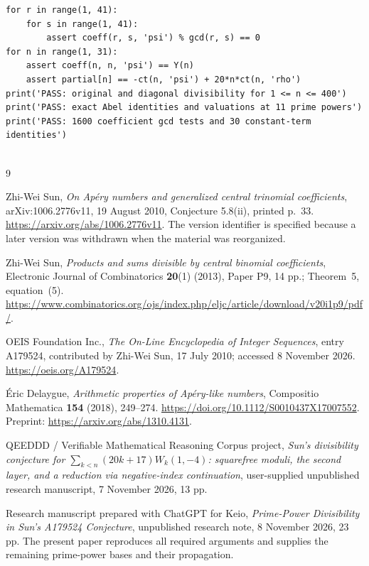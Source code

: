 \documentclass[11pt,a4paper]{article}
\theoremstyle{remark}\newtheorem{remark}[theorem]{Remark}
\begin{document}
\begin{lstlisting}
for r in range(1, 41):
    for s in range(1, 41):
        assert coeff(r, s, 'psi') % gcd(r, s) == 0
for n in range(1, 31):
    assert coeff(n, n, 'psi') == Y(n)
    assert partial[n] == -ct(n, 'psi') + 20*n*ct(n, 'rho')
print('PASS: original and diagonal divisibility for 1 <= n <= 400')
print('PASS: exact Abel identities and valuations at 11 prime powers')
print('PASS: 1600 coefficient gcd tests and 30 constant-term identities')


\end{lstlisting}

\begin{thebibliography}{9}\raggedright

Zhi-Wei Sun,
\emph{On Ap\'ery numbers and generalized central trinomial coefficients},
arXiv:1006.2776v11, 19 August 2010, Conjecture 5.8(ii), printed p.~33.
\url{https://arxiv.org/abs/1006.2776v11}.
The version identifier is specified because a later version was
withdrawn when the material was reorganized.

Zhi-Wei Sun,
\emph{Products and sums divisible by central binomial coefficients},
Electronic Journal of Combinatorics \textbf{20}(1) (2013), Paper P9,
14 pp.; Theorem~5, equation~(5).
\url{https://www.combinatorics.org/ojs/index.php/eljc/article/download/v20i1p9/pdf/}.

OEIS Foundation Inc.,
\emph{The On-Line Encyclopedia of Integer Sequences}, entry A179524,
contributed by Zhi-Wei Sun, 17 July 2010; accessed 8 November 2026.
\url{https://oeis.org/A179524}.

\'Eric Delaygue,
\emph{Arithmetic properties of Ap\'ery-like numbers},
Compositio Mathematica \textbf{154} (2018), 249--274.
\url{https://doi.org/10.1112/S0010437X17007552}.
Preprint: \url{https://arxiv.org/abs/1310.4131}.

QEEDDD / Verifiable Mathematical Reasoning Corpus project,
\emph{Sun's divisibility conjecture for
\(\sum_{k<n}(20k+17)W_k(1,-4)\): squarefree moduli, the second layer,
and a reduction via negative-index continuation},
user-supplied unpublished research manuscript, 7 November 2026,
13 pp.

Research manuscript prepared with ChatGPT for Keio,
\emph{Prime-Power Divisibility in Sun's A179524 Conjecture},
unpublished research note, 8 November 2026, 23 pp.
The present paper reproduces all required arguments and supplies
the remaining prime-power bases and their propagation.

\end{thebibliography}
\end{document}
